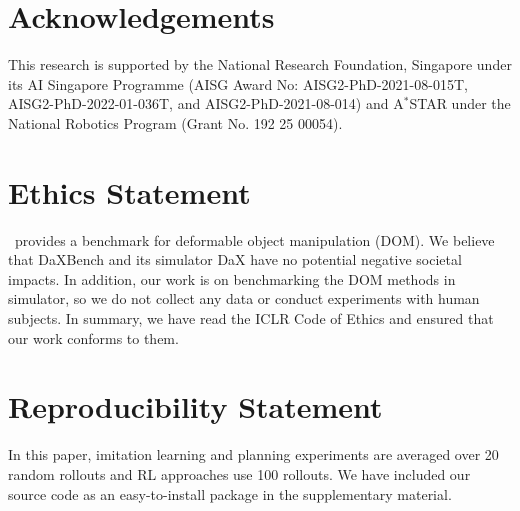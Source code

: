\documentclass{article} %
\begin{document}
\newpage

\section*{Acknowledgements}
This research is supported by the National Research Foundation, Singapore under its AI Singapore Programme (AISG Award No: AISG2-PhD-2021-08-015T, AISG2-PhD-2022-01-036T, and AISG2-PhD-2021-08-014) and A\(^*\)STAR under the National Robotics Program (Grant No. 192 25 00054).

\section*{Ethics Statement}

\algo\ provides a benchmark for deformable object manipulation (DOM). 
We believe that DaXBench and its simulator DaX have no potential negative societal impacts. In addition, our work is on benchmarking the DOM methods in simulator, so we do not collect any data or conduct experiments with human subjects. In summary, we have read the ICLR Code of Ethics and ensured that our work conforms to them.




\section*{Reproducibility Statement}
In this paper, imitation learning and planning experiments are averaged over 20 random rollouts and RL approaches use 100 rollouts. We have included our source code as an easy-to-install package in the supplementary material.





\newpage
\appendix





\end{document}
